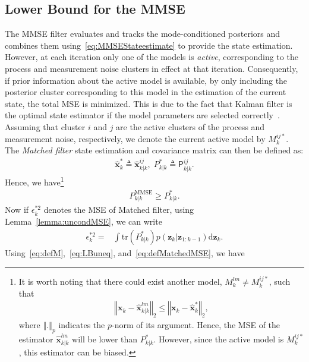 \documentclass[10pt,twocolumn,twoside]{IEEEtran}
\newcommand{\Pmmse}{P_{k|k}^{\mathrm{MMSE}}}
\begin{document}
\subsection{Lower Bound for the MMSE}
\label{sec:LB}
The MMSE filter evaluates and tracks the mode-conditioned posteriors and combines them using~\eqref{eq:MMSEStateestimate} to provide the state estimation. However, at each iteration only one of the models is \textit{active}, corresponding to the process and measurement noise clusters in effect at that iteration. Consequently, if prior information about the active model is available, by only including the posterior cluster corresponding to this model in the estimation of the current state, the total MSE is minimized. This is due to the fact that Kalman filter is the optimal state estimator if the model parameters are selected correctly~\cite{arulampalam_tutorial_2002,ho_bayesian_1964}. Assuming that cluster \(i\) and \(j\) are the active clusters of the process and measurement noise, respectively, we denote the current active model by \(M^{ij*}_k\). The \textit{Matched filter} state estimation and covariance matrix can then be defined as:
\begin{align}
\hat{\mathbf{{x}}}_{k}^{*} \triangleq \mathsf{\hat{\boldsymbol{x}}}_{k|k}^{ij}, \;
P_{k|k}^* \triangleq  \mathsf{P}_{k|k}^{ij}.
\end{align}
Hence, we have\footnote{It is worth noting that there could exist another model, \(M^{lm}_k\neq M^{ij*}_k\), such that
\begin{align}
\left\Vert\mathbf{x}_{k}-\mathsf{\hat{\boldsymbol{x}}}_{k|k}^{lm}\right\Vert_{2} \leq \left\Vert\mathbf{x}_{k}-\hat{\mathbf{{x}}}_{k}^{*}\right\Vert_2,
\end{align}
where \(\left\Vert.\right\Vert_{p}\) indicates the \(p\)-norm of its argument.
Hence, the MSE of the estimator \(\mathsf{\hat{\boldsymbol{x}}}_{k|k}^{lm}\) will be lower than \(P_{k|k}^*\). However, since the active model is \(M^{ij*}_k\), this estimator can be biased. }
\begin{align}
\label{eq:LBuneq}
\Pmmse \geq P_{k|k}^*.
\end{align}
Now if \(\epsilon_k ^{*2}\) denotes the MSE of Matched filter, using Lemma~\ref{lemma:uncondMSE}, we can write
\begin{align}
\label{eq:defMatchedMSE}
\epsilon_k ^{*2} = & \int \mathrm{tr}{\left(P_{k|k}^*\right)}p{\left(\mathbf{{z}}_{k}|\mathbf{{z}}_{1:k-1}\right)} \mathrm{d}\mathbf{{z}}_{k}.
\end{align}
Using~\eqref{eq:defM},~\eqref{eq:LBuneq}, and~\eqref{eq:defMatchedMSE}, we have
\end{document}
